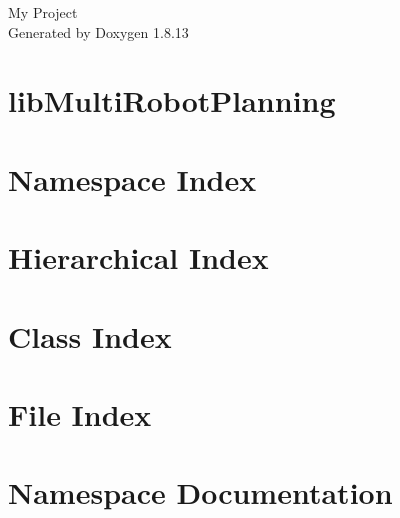 \documentclass[twoside]{book}
\newcommand{\+}{\discretionary{\mbox{\scriptsize$\hookleftarrow$}}{}{}}
\newcommand{\clearemptydoublepage}{%
  \newpage{\pagestyle{empty}\cleardoublepage}%
}
\begin{document}
\hypersetup{pageanchor=false,
             bookmarksnumbered=true,
             pdfencoding=unicode
            }
\begin{titlepage}
\vspace*{7cm}
\begin{center}%
{\Large My Project }\\
\vspace*{1cm}
{\large Generated by Doxygen 1.8.13}\\
\end{center}
\end{titlepage}
\clearemptydoublepage
{}
\tableofcontents
\clearemptydoublepage
{}
\hypersetup{pageanchor=true}

\chapter{lib\+Multi\+Robot\+Planning}
\label{index}\hypertarget{index}{}
\chapter{Namespace Index}

\chapter{Hierarchical Index}

\chapter{Class Index}

\chapter{File Index}

\chapter{Namespace Documentation}






\end{document}
